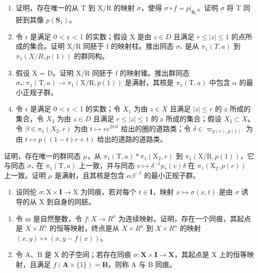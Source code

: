\begin{enumerate}
\def\labelenumi{\alph{enumi})}
\item
  证明，存在唯一的从 T 到 X/R 的映射 \(\sigma\)，使得 \(\sigma \circ f = p|_{\mathbf{S}_1}\)。证明 \(\sigma\) 将 T 同胚到其像 \(p(\mathbf{S}_1)\)。
\item
  令 r 是满足 0 \textless{} r \textless{} 1 的实数；假设 X 是由 \(z \in D\) 且满足 \(r \leqslant |z| \leqslant 1\) 的点所成的集合。证明 X/R 同胚于 f 的映射柱。推出同态 \(\sigma_{*}\) 是从 \(\pi_{1}(T, a)\) 到 \(\pi_{1}(X/R, p(1))\) 的群同构。
\item
  假设 X = D。证明 X/R 同胚于 f 的映射锥。推出群同态 \(\sigma_{*}\colon\pi_{1}(\mathrm{T},a)\to\pi_{1}(\mathrm{X}/\mathrm{R},p(1))\) 是满射，其核是 \(\pi_{1}(\mathrm{T},a)\) 中包含 \(\alpha\) 的最小正规子群。
\item
  令 r 是满足 0 \textless{} r \textless{} 1 的实数；令 \(X_{1}\) 为由 \(z \in X\) 且满足 \(|z| \leqslant r\) 的 z 所成的集合，令 \(X_{2}\) 为由 \(z \in D\) 且满足 \(r \leqslant |z| \leqslant 1\) 的 z 所成的集合；假设 \(X_{2} \subset X\)。令 \(\beta \in \pi_{1}(X_{2}, r)\) 为由 \(t \mapsto re^{2\pi it}\) 给出的圈的道路类；令 \(\delta \in \varpi_{p(r), p(1)}\) 为由 \(t \mapsto p((1 - t)r + t)\) 给出的道路的道路类。
\end{enumerate}

  证明，存在唯一的群同态 \(\mu\)，从 \(\pi_1(\mathrm{T},a)*\pi_1(\mathrm{X}_2,r)\) 到 \(\pi_1(\mathrm{X} / \mathrm{R},p(1))\)，它与同态 \(\sigma_*\) 在 \(\pi_1(\mathrm{T},a)\) 上一致，并与同态 \(v\mapsto \delta^{-1}p_{*}(v)\delta\) 在 \(\pi_1(\mathrm{X}_2,p(r))\) 上一致。证明 \(\mu\) 是满射，且其核是包含 \(\alpha \beta^{-1}\) 的最小正规子群。

\begin{enumerate}
\def\labelenumi{\arabic{enumi})}
\setcounter{enumi}{27}
\tightlist
\item
  设同伦 \(\sigma: \mathrm{X} \times \mathbf{I} \to \mathrm{X}\) 为同痕，若对每个 \(t \in \mathbf{I}\)，映射 \(x \mapsto \sigma(x, t)\) 是由 \(\sigma\) 诱导的从 X 到自身的同胚。
\end{enumerate}

\begin{enumerate}
\def\labelenumi{\alph{enumi})}
\item
  令 m 是自然整数，令 \(f: X \to R^{n}\) 为连续映射。证明，存在一个同痕，其起点是 \(X \times R^{n}\) 的恒等映射，终点是从 \(X \times R^{n}\) 到 \(X \times R^{n}\) 的映射 \((x, y) \mapsto (x, y - f(x))\)。
\item
  令 A、B 是 X 的子空间；若存在同痕 \(\sigma\colon\mathbf{X}\times\mathbf{I}\to\mathbf{X}\)，其起点是 X 上的恒等映射，且满足 \(f(\mathbf{A}\times\{1\})=\mathbf{B}\)，则称 A 与 B 同痕。
\end{enumerate}

